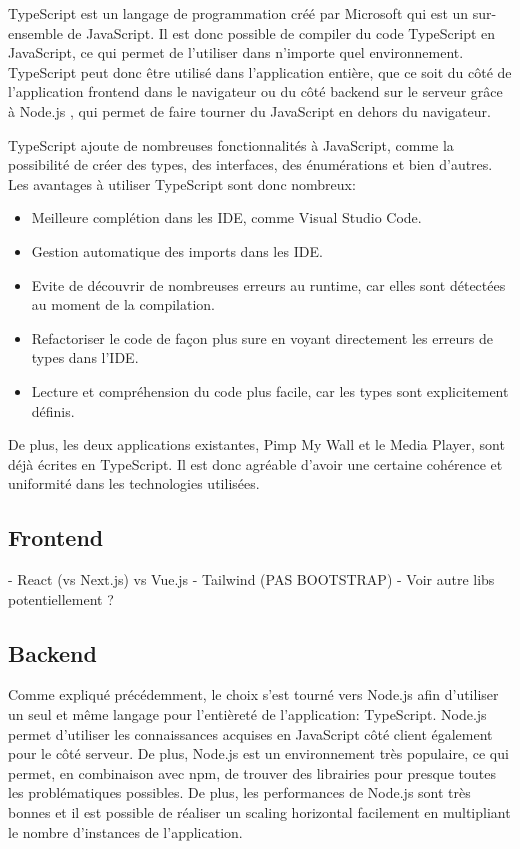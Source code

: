 TypeScript \cite{typescript} est un langage de programmation créé par Microsoft qui est un sur-ensemble de JavaScript. Il est donc possible de compiler du code TypeScript en JavaScript, ce qui permet de l'utiliser dans n'importe quel environnement. TypeScript peut donc être utilisé dans l'application entière, que ce soit du côté de l'application frontend dans le navigateur ou du côté backend sur le serveur grâce à Node.js \cite{nodejs}, qui permet de faire tourner du JavaScript en dehors du navigateur.

TypeScript ajoute de nombreuses fonctionnalités à JavaScript, comme la possibilité de créer des types, des interfaces, des énumérations et bien d'autres. Les avantages à utiliser TypeScript sont donc nombreux:

\begin{itemize}
  \item Meilleure complétion dans les IDE, comme Visual Studio Code.
  \item Gestion automatique des imports dans les IDE.
  \item Evite de découvrir de nombreuses erreurs au runtime, car elles sont détectées au moment de la compilation.
  \item Refactoriser le code de façon plus sure en voyant directement les erreurs de types dans l'IDE.
  \item Lecture et compréhension du code plus facile, car les types sont explicitement définis.
\end{itemize}

De plus, les deux applications existantes, Pimp My Wall et le Media Player, sont déjà écrites en TypeScript. Il est donc agréable d'avoir une certaine cohérence et uniformité dans les technologies utilisées.

\subsection{Frontend}

- React (vs Next.js) vs Vue.js
- Tailwind (PAS BOOTSTRAP)
- Voir autre libs potentiellement ?

\subsection{Backend}

Comme expliqué précédemment, le choix s'est tourné vers Node.js \cite{nodejs} afin d'utiliser un seul et même langage pour l'entièreté de l'application: TypeScript. Node.js permet d'utiliser les connaissances acquises en JavaScript côté client également pour le côté serveur. De plus, Node.js est un environnement très populaire, ce qui permet, en combinaison avec \Gls{npm}, de trouver des librairies pour presque toutes les problématiques possibles. De plus, les performances de Node.js sont très bonnes et il est possible de réaliser un scaling horizontal facilement en multipliant le nombre d'instances de l'application.

